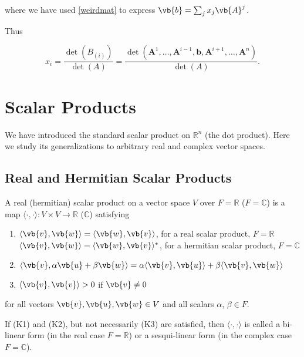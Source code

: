 \documentclass[a4paper,12pt]{report}
\begin{document}
where we have used \cref{weirdmat} to express \(\vb{b}  = \sum_{j}^{} x_{j}\vb{A} ^{j}  \).  

Thus

\begin{equation}
x_i = \frac{\det(B_{(i)})}{\det(A)} = \frac{\det(\mathbf{A}^1, \ldots, \mathbf{A}^{i-1}, \mathbf{b}, \mathbf{A}^{i+1}, \ldots, \mathbf{A}^n)}{\det(A)} .
\end{equation}









\chapter{Scalar Products}

We have introduced the standard scalar product on \(\mathbb{R}^{n} \) (the dot product). Here we study its generalizations to arbitrary real and complex vector spaces.

\section{Real and Hermitian Scalar Products}

\begin{definition} \label{scalarproduct} 
    A real (hermitian) scalar product on a vector space \( V \) over \( F = \mathbb{R} \) (\( F = \mathbb{C} \)) is a map \(\langle \cdot, \cdot \rangle : V \times V \rightarrow \mathbb{R} \) (\( \mathbb{C} \)) satisfying
    \begin{enumerate}[label=(K\arabic*)]
        \item \(\langle \vb{v}, \vb{w} \rangle = \langle \vb{w}, \vb{v} \rangle\), for a real scalar product, \( F = \mathbb{R} \)\\
              \(\langle \vb{v}, \vb{w} \rangle = \langle \vb{w}, \vb{v} \rangle^*\), for a hermitian scalar product, \( F = \mathbb{C} \)
        \item \(\langle \vb{v}, \alpha \vb{u} + \beta \vb{w} \rangle = \alpha \langle \vb{v}, \vb{u} \rangle + \beta \langle \vb{v}, \vb{w} \rangle\)
        \item \(\langle \vb{v}, \vb{v} \rangle > 0\) if \(\vb{v} \neq 0\)
    \end{enumerate}
    for all vectors \(\vb{v}, \vb{u}, \vb{w} \in V\) and all scalars \(\alpha\), \(\beta \in F\).
    
    If (K1) and (K2), but not necessarily (K3) are satisfied, then \(\langle \cdot, \cdot \rangle\) is called a bi-linear form (in the real case \( F = \mathbb{R} \)) or a sesqui-linear form (in the complex case \( F = \mathbb{C} \)).
\end{definition}
\end{document}
